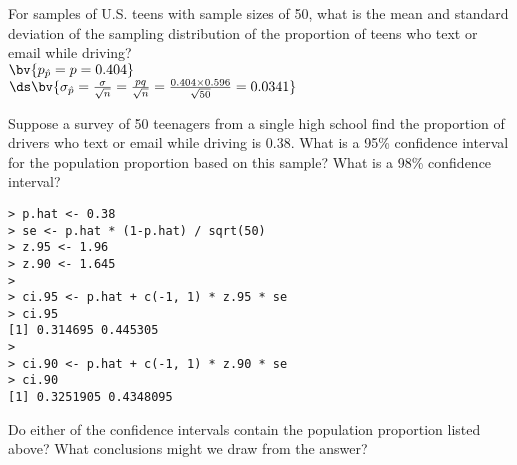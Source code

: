 \documentclass{article}
\begin{document}
\begin{flushleft}
\begin{enumalpha}
\item For samples of U.S. teens with sample sizes of 50, what is the mean and standard deviation of the sampling distribution of the proportion of teens who text or email while driving?\\
\medskip
$\bv{p_{\hat p} = p = 0.404}$\\
\smallskip
$\ds \bv{\sigma_{\hat p} = \frac {\sigma}{\sqrt{n}} = \frac{pq}{\sqrt n} = \frac {0.404 \times 0.596}{\sqrt{50}} = 0.0341}$

\vspace{0.5in}

\item Suppose a survey of 50 teenagers from a single high school find the proportion of drivers who text or email while driving is 0.38. What is a 95\% confidence interval for the population proportion based on this sample? What is a 98\% confidence interval? \\
\medskip
\begin{verbatim}
> p.hat <- 0.38
> se <- p.hat * (1-p.hat) / sqrt(50)
> z.95 <- 1.96
> z.90 <- 1.645
> 
> ci.95 <- p.hat + c(-1, 1) * z.95 * se
> ci.95
[1] 0.314695 0.445305
> 
> ci.90 <- p.hat + c(-1, 1) * z.90 * se
> ci.90
[1] 0.3251905 0.4348095
\end{verbatim}

\vspace{0.5in}
\item Do either of the confidence intervals contain the population proportion listed above? What conclusions might we draw from the answer?\\
\medskip


\end{enumalpha}

\end{flushleft}
\end{document}
